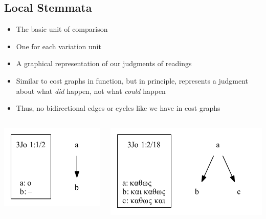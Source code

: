 \documentclass[10pt]{beamer}
\begin{document}
	\subsection{Local Stemmata}
	\begin{frame}
		\begin{itemize}
			\item The basic unit of comparison
			\item One for each variation unit
			\item A graphical representation of our judgments of readings
			\item Similar to cost graphs in function, but in principle, represents a judgment about what \emph{did} happen, not what \emph{could} happen
			\item Thus, no bidirectional edges or cycles like we have in cost graphs
		\end{itemize}
		\begin{columns}
			\begin{column}{0.45\textwidth}
				\begin{center}
					\includegraphics[scale=0.5]{../img/B25K1V1U2-local-stemma.pdf}
				\end{center}
			\end{column}
			\begin{column}{0.45\textwidth}
				\begin{center}
					\includegraphics[scale=0.5]{../img/B25K1V2U18-local-stemma.pdf}
				\end{center}
			\end{column}
		\end{columns}
	\end{frame}
\end{document}
